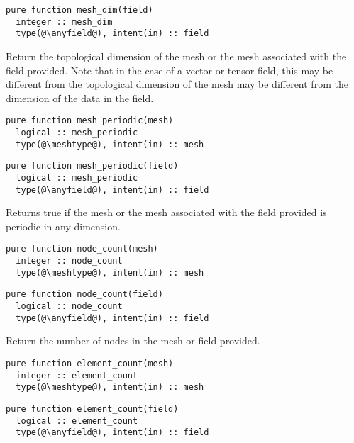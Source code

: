 \documentclass[a4paper, 11pt]{book}
\begin{document}
\begin{lstlisting}
pure function mesh_dim(field)
  integer :: mesh_dim
  type(@\anyfield@), intent(in) :: field
\end{lstlisting}

Return the topological dimension of the mesh or the mesh associated with the
field provided. Note that in the case of a vector or tensor field, this may
be different from the topological dimension of the mesh may be different
from the dimension of the data in the field.


\begin{lstlisting}
pure function mesh_periodic(mesh)
  logical :: mesh_periodic
  type(@\meshtype@), intent(in) :: mesh
\end{lstlisting}

\begin{lstlisting}
pure function mesh_periodic(field)
  logical :: mesh_periodic
  type(@\anyfield@), intent(in) :: field
\end{lstlisting}

Returns true if the mesh or the mesh associated with the field provided is
periodic in any dimension.


\begin{lstlisting}
pure function node_count(mesh)
  integer :: node_count
  type(@\meshtype@), intent(in) :: mesh
\end{lstlisting}

\begin{lstlisting}
pure function node_count(field)
  logical :: node_count
  type(@\anyfield@), intent(in) :: field
\end{lstlisting}

Return the number of nodes in the mesh or field provided.


\begin{lstlisting}
pure function element_count(mesh)
  integer :: element_count
  type(@\meshtype@), intent(in) :: mesh
\end{lstlisting}

\begin{lstlisting}
pure function element_count(field)
  logical :: element_count
  type(@\anyfield@), intent(in) :: field
\end{lstlisting}
\end{document}
